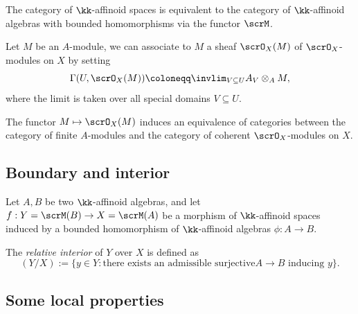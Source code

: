     \begin{proposition}\label{prop:equivalence_between_affinoid_space_and_affinoid_algebra}
        The category of \(\kk\)-affinoid spaces is equivalent to the category of \(\kk\)-affinoid algebras with bounded homomorphisms via the functor \(\scrM\).
    \end{proposition}


    Let \(M\) be an \(A\)-module, we can associate to \(M\) a sheaf \(\scrO_X(M)\) of \(\scrO_X\)-modules on \(X\) by setting
    \[ \Gamma(U, \scrO_X(M)) \coloneqq \invlim_{V \subseteq U} A_V \otimes_A M, \]
    where the limit is taken over all special domains \(V \subseteq U\).

    \begin{proposition}\label{thm:equivalence_between_finite_A_modules_and_coherent_sheaves_on_affinoid_space}
        The functor \(M \mapsto \scrO_X(M)\) induces an equivalence of categories between the category of finite \(A\)-modules and the category of coherent \(\scrO_X\)-modules on \(X\).
    \end{proposition}



\subsection{Boundary and interior}

    Let \(A, B\) be two \(\kk\)-affinoid algebras, and let \(f: Y=\scrM(B) \to X = \scrM(A)\) be a morphism of \(\kk\)-affinoid spaces induced by a bounded homomorphism of \(\kk\)-affinoid algebras \(\phi: A \to B\).

    \begin{definition}\label{def:relative_boundary_and_interior}
        The \emph{relative interior} of \(Y\) over \(X\) is defined as
        \[ (Y/X) := \{ y \in Y \colon \text{there exists an admissible surjective} A \to B \text{ inducing } y \}. \]
    \end{definition}

    \begin{definition}\label{def:Shilov_boundary}
        
    \end{definition}


\subsection{Some local properties}

